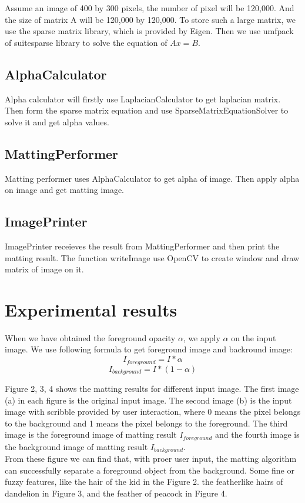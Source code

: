 \documentclass[11pt,letterpaper]{article}
\begin{document}
Assume an image of 400 by 300 pixels, the number of pixel will be 120,000. And the size of matrix A will be 120,000 by 120,000. To store such a large matrix, we use the sparse matrix library, which is provided by Eigen. Then we use umfpack of suitesparse library to solve the equation of $Ax=B$. \\

\subsection{AlphaCalculator}
Alpha calculator will firstly use LaplacianCalculator to get laplacian matrix. Then form the sparse matrix equation and use SparseMatrixEquationSolver to solve it and get alpha values.

\subsection{MattingPerformer}
Matting performer uses AlphaCalculator to get alpha of image. Then apply alpha on image and get matting image.

\subsection{ImagePrinter}
ImagePrinter receieves the result from MattingPerformer and then print the matting result. The function writeImage use OpenCV to create window and draw matrix of image on it. 

\newpage
\section{Experimental results}
When we have obtained the foreground opacity $\alpha$, we apply $\alpha$ on the input image. We use following formula to get foreground image and backround image:
$$I_{foreground} = I * \alpha$$
$$I_{background} = I * (1-\alpha)$$

Figure 2, 3, 4 shows the matting results for different input image. The first image (a) in each figure is the original input image. The second image (b) is the input image with scribble provided by user interaction, where 0 means the pixel belongs to the background and 1 means the pixel belongs to the foreground. The third image is the foreground image of matting result $I_{foreground}$ and the fourth image is the background image of matting result $I_{background}$.\\

From these figure we can find that, with proer user input, the matting algorithm can successfully separate a foreground object from the background. Some fine or fuzzy features, like the hair of the kid in the Figure 2. the featherlike hairs of dandelion in Figure 3, and the feather of peacock in Figure 4. \\
\end{document}

